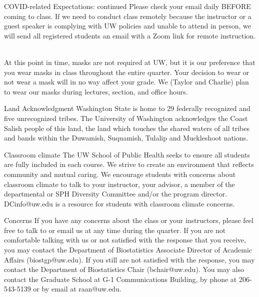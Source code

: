 \documentclass[10pt,t]{beamer}
\begin{document}
\begin{frame}{COVID-related Expectations: continued}
Please check your email daily BEFORE coming to class. If we need to conduct class remotely because the instructor or a guest speaker is complying with UW policies and unable to attend in person, we will send all registered students an email with a Zoom link for remote instruction. \\~\

At this point in time, masks are not required at UW, but it is our preference that you wear masks in class throughout the entire quarter. Your decision to wear or not wear a mask will in no way affect your grade. We (Taylor and Charlie) plan to wear our masks during lectures, section, and office hours.

\end{frame}

\begin{frame}{Land Acknowledgment}
Washington State is home to 29 federally recognized and five unrecognized tribes. The University of Washington acknowledges the Coast Salish people of this land, the land which touches the shared waters of all tribes and bands within the Duwamish, Suquamish, Tulalip and Muckleshoot nations.
\end{frame}

\begin{frame}{Classroom climate}
The UW School of Public Health seeks to ensure all students are fully included in each course. We strive to create an environment that reflects community and mutual caring. We encourage students with concerns about classroom climate to talk to your instructor, your advisor, a member of the departmental or SPH Diversity Committee and/or the program director. DCinfo@uw.edu is a resource for students with classroom climate concerns.
\end{frame}

\begin{frame}{Concerns}
If you have any concerns about the class or your instructors, please feel free to talk to or email us at any time during the quarter. If you are not comfortable talking with us or not satisfied with the response that you receive, you may contact the Department of Biostatistics Associate Director of Academic Affairs (biostgp@uw.edu). If you still are not satisfied with the response, you may contact the Department of Biostatistics Chair (bchair@uw.edu). You may also contact the Graduate School at G-1 Communications Building, by phone at 206-543-5139 or by email at raan@uw.edu.
\end{frame}
\end{document}
